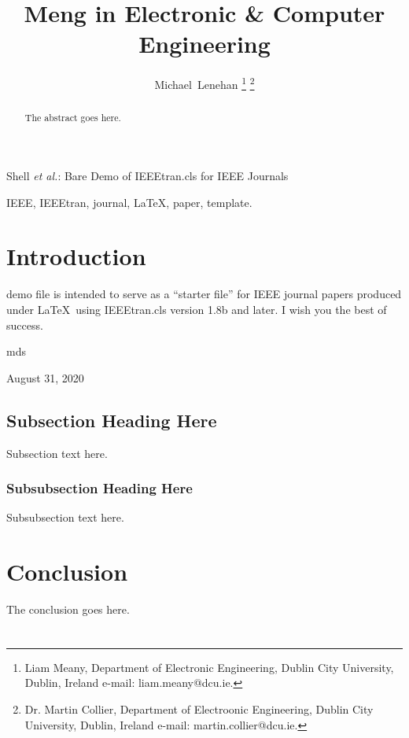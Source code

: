 \documentclass[a4paper,journal]{IEEEtran}
\begin{document}
\title{Meng in Electronic \& Computer Engineering}
\author{Michael~Lenehan%
\thanks{Liam Meany, Department
of Electronic Engineering, Dublin City University, Dublin,
Ireland e-mail: liam.meany@dcu.ie.}%
\thanks{Dr. Martin Collier, Department
of Electroonic Engineering, Dublin City University, Dublin,
Ireland e-mail: martin.collier@dcu.ie.}%
}


%
{Shell \MakeLowercase{\textit{et al.}}: Bare Demo of IEEEtran.cls for IEEE Journals}


\maketitle

\begin{abstract}
The abstract goes here.
\end{abstract}

\begin{IEEEkeywords}
IEEE, IEEEtran, journal, \LaTeX, paper, template.
\end{IEEEkeywords}
\section{Introduction}
 demo file is intended to serve as a ``starter file''
for IEEE journal papers produced under \LaTeX\ using
IEEEtran.cls version 1.8b and later.
I wish you the best of success.

\hfill mds

\hfill August 31, 2020

\subsection{Subsection Heading Here}
Subsection text here.


\subsubsection{Subsubsection Heading Here}
Subsubsection text here.

\section{Conclusion}
The conclusion goes here.

\clearpage
\appendices
\section*{}






\printbibliography
\end{document}
